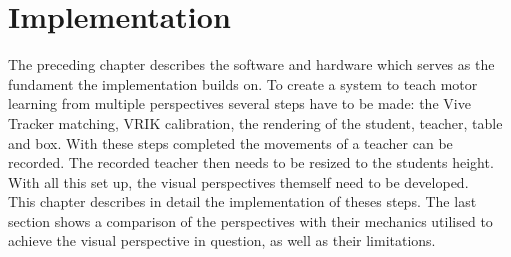 \chapter{Implementation}
The preceding chapter describes the software and hardware which serves as the fundament the implementation builds on. To create a system to teach motor learning from multiple perspectives several steps have to be made: the Vive Tracker matching, VRIK calibration, the rendering of the student, teacher, table and box. With these steps completed the movements of a teacher can be recorded. The recorded teacher then needs to be resized to the students height. With all this set up, the visual perspectives themself need to be developed.\\
This chapter describes in detail the implementation of theses steps. The last section shows a comparison of the perspectives with their mechanics utilised to achieve the visual perspective in question, as well as their limitations.

